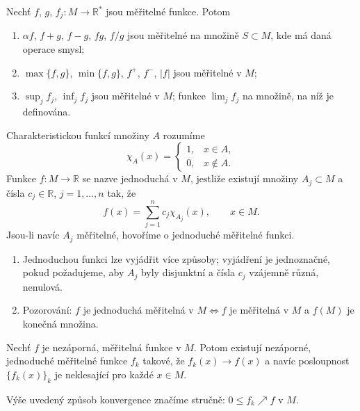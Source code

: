 \begin{veta}
Nechť $f$, $g$, $f_j : M \to \mathbb{R}^*$ jsou měřitelné funkce.
Potom
\begin{enumerate}[1.]
\item $\alpha f$, $f + g$, $f - g$, $fg$, $f / g$ jsou měřitelné na
množině $S \subset M$, kde má daná operace smysl;
\item $\max\{f, g\}$, $\min\{f, g\}$, $f^+$, $f^-$, $|f|$ jsou
měřitelné v $M$;
\item $\sup_j f_j$, $\inf_j f_j$ jsou měřitelné v $M$; funkce
$\lim_j f_j$ na množině, na níž je definována.
\end{enumerate}
\end{veta}

\begin{definice}
Charakteristickou funkcí množiny $A$ rozumíme
\[
\chi_A(x) = \begin{cases} 1, & x \in A, \\ 0, & x \notin A.
\end{cases}
\]
Funkce $f : M \to \mathbb{R}$ se nazve jednoduchá v $M$, jestliže
existují množiny $A_j \subset M$ a čísla $c_j \in \mathbb{R}$,
$j = 1, \ldots, n$ tak, že
\[
f(x) = \sum_{j=1}^n c_j \chi_{A_j}(x), \qquad x \in M.
\]
Jsou-li navíc $A_j$ měřitelné, hovoříme o jednoduché měřitelné funkci.
\end{definice}

\begin{poznamka}
\begin{enumerate}{1.}
\item Jednoduchou funkci lze vyjádřit více způsoby; vyjádření je
jednoznačné, pokud požadujeme, aby $A_j$ byly disjunktní a čísla $c_j$
vzájemně různá, nenulová.

\item Pozorování: $f$ je jednoduchá měřitelná v $M \iff f$ je
měřitelná v $M$ a $f(M)$ je konečná množina.
\end{enumerate}

\end{poznamka}

\begin{veta}
Nechť $f$ je nezáporná, měřitelná funkce v $M$. Potom existují
nezáporné, jednoduché měřitelné funkce $f_k$ takové, že
$f_k(x) \to f(x)$ a navíc posloupnost $\{f_k(x)\}_k$ je neklesající pro
každé $x \in M$.
\end{veta}

\begin{poznamka}
Výše uvedený způsob konvergence značíme stručně:
$0 \le f_k \nearrow f$ v $M$.
\end{poznamka}

